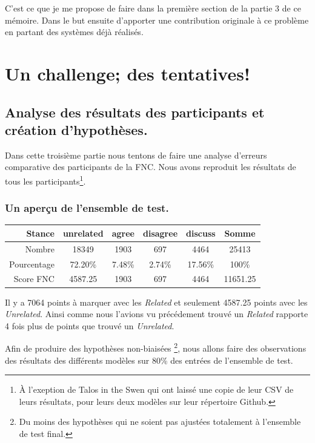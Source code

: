 \documentclass[11pt,a4paper,oldfontcommands]{memoir}
\begin{document}
C'est ce que je me propose de faire dans la première section de la partie 3 de ce mémoire.
Dans le but ensuite d'apporter une contribution originale à ce problème en partant des systèmes déjà réalisés.


\chapter{Un challenge; des tentatives!}

\section{Analyse des résultats des participants et création d'hypothèses.}
Dans cette troisième partie nous tentons de faire une analyse d'erreurs
comparative des participants de la FNC. Nous avons reproduit les résultats de
tous les participants\footnote{À l'exeption de Talos in the Swen qui ont laissé
 une copie de leur CSV de leurs résultats, pour leurs deux modèles sur leur
 répertoire Github.}.
\subsection{Un aperçu de l'ensemble de test.}
\begin{center}

 \begin{tabular}{ r | c c c c | c}
  Stance      & unrelated & agree  & disagree & discuss &          
  Somme                                                            \\
  \hline
  Nombre      & 18349     & 1903   & 697      & 4464    & 25413    \\
  Pourcentage & 72.20\%   & 7.48\% & 2.74\%   & 17.56\% & 100\%    \\
  Score FNC   & 4587.25   & 1903   & 697      & 4464    & 11651.25 \\
 \end{tabular}
\end{center}

Il y a 7064 points à marquer avec les \textit{Related} et seulement 4587.25 points avec les \textit{Unrelated}.
Ainsi comme nous l'avions vu précédement trouvé un \textit{Related} rapporte 4 fois plus de points que trouvé un \textit{Unrelated}.

Afin de produire des hypothèses non-biaisées  \footnote{Du moins des hypothèses qui ne soient pas ajustées totalement à l'ensemble de test final.}, nous allons faire des observations des résultats des différents modèles sur 80\% des entrées de l'ensemble de test.
\end{document}
